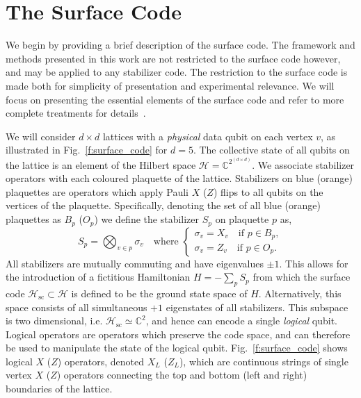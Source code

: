 \documentclass[twocolumn,preprintnumbers,amsmath,amssymb,notitlepage,nofootinbib,longbibliography,superscriptaddress,aps,pra,10pt]{revtex4-1}
\begin{document}
\section{The Surface Code}\label{s:the_surface_code}

	We begin by providing a brief description of the surface code.
	The framework and methods presented in this work are not restricted to the surface code however, and may be applied to any stabilizer code.
	The restriction to the surface code is made both for simplicity of presentation and experimental relevance.
	We will focus on presenting the essential elements of the surface code and refer to more complete treatments for details~\cite{Gottesman97, Terhal15,Litinski18b}.

	We will consider $d\times d$ lattices with a \textit{physical} data qubit on each vertex $v$, as illustrated in Fig.~\ref{f:surface_code} for $d=5$.
	The collective state of all qubits on the lattice is an element of the Hilbert space $\mathcal{H} = \mathbb{C}^{2^{(d\times d)}}$.
	We associate stabilizer operators with each coloured plaquette of the lattice.
	Stabilizers on blue (orange) plaquettes are operators which apply Pauli $X$ ($Z$) flips to all qubits on the vertices of the plaquette.
	Specifically, denoting the set of all blue (orange) plaquettes as $B_p$ ($O_p$) we define the stabilizer $S_p$ on plaquette $p$ as,
	\begin{equation}\label{e:stabilizer_definition}
		S_p = \bigotimes_{v\in p} \sigma_v \quad \text{where }
		\begin{cases}
			\sigma_v = X_v \quad \text{if } p \in B_p,\\
			\sigma_v = Z_v \quad \text{if } p \in O_p.
		\end{cases}
	\end{equation}
	All stabilizers are mutually commuting and have eigenvalues $\pm 1$.
	This allows for the introduction of a fictitious Hamiltonian $H = -\sum_p S_p$ from which the surface code $\mathcal{H}_\mathrm{sc} \subset \mathcal{H}$ is defined to be the ground state space of $H$.
	Alternatively, this space consists of all simultaneous $+1$ eigenstates of all stabilizers.
	This subspace is two dimensional, i.e. $\mathcal{H}_\mathrm{sc} \simeq \mathbb{C}^2$, and hence can encode a single \textit{logical} qubit.
	Logical operators are operators which preserve the code space, and can therefore be used to manipulate the state of the logical qubit.
	Fig.~\ref{f:surface_code} shows logical $X$ ($Z$) operators, denoted $X_L$ ($Z_L$), which are continuous strings of single vertex $X$ ($Z$) operators connecting the top and bottom (left and right) boundaries of the lattice.
	
\end{document}
